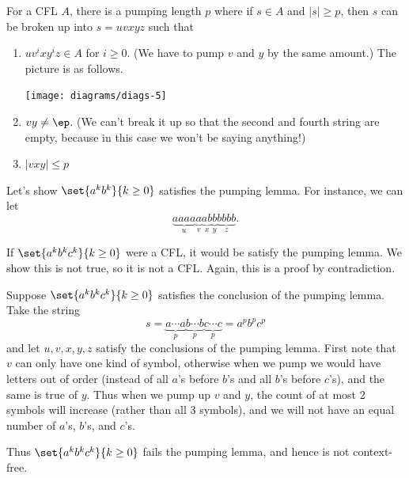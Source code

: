 \begin{lem}
For a CFL $A$, there is a pumping length $p$ where if $s\in A$ and $|s|\ge p$, then $s$ can be broken up into $s=uvxyz$ such that
\begin{enumerate}
\item
$uv^ixy^i z\in A$ for $i\ge 0$. (We have to pump $v$ and $y$ by the same amount.) The picture is as follows.

\begin{center}
\texttt{[image: diagrams/diags-5]}
\end{center}
\item
$vy\ne \ep$.
(We can't break it up so that the second and fourth string are empty, because in this case we won't be saying anything!)
\item $|vxy|\le p$
\end{enumerate}
\end{lem}
\begin{ex}
Let's show $\set{a^kb^k}{k\ge 0}$ satisfies the pumping lemma. For instance, we can let
\[
\underbrace{aaaa}_u\underbrace{a}_v\underbrace{ab}_x \underbrace{b}_y\underbrace{bbbb}_z.
\]
\end{ex}
\begin{ex}
If $\set{a^kb^kc^k}{k\ge 0}$ were a CFL, it would be satisfy the pumping lemma. We show this is not true, so it is not a CFL. Again, this is a proof by contradiction.

Suppose $\set{a^kb^kc^k}{k\ge 0}$ satisfies the conclusion of the pumping lemma. Take the string
\[
s=\underbrace{a\cdots a}_p\underbrace{b\cdots b}_p\underbrace{c\cdots c}_p=a^pb^pc^p
\]
and let $u,v,x,y,z$ satisfy the conclusions of the pumping lemma.
First note that $v$ can only have one kind of symbol, otherwise when we pump we would have letters out of order (instead of all $a$'s before $b$'s and all $b$'s before $c$'s), and the same is true of $y$. Thus when we pump up $v$ and $y$, the count of at most  2 symbols will  increase (rather than all 3 symbols), and we will not have an equal number of $a$'s, $b$'s, and $c$'s.

Thus $\set{a^kb^kc^k}{k\ge 0}$ fails the pumping lemma, and hence is not context-free.
\end{ex}
